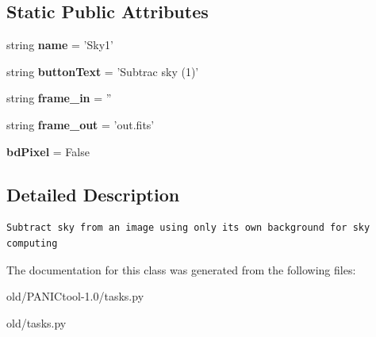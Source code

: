 \subsection*{Static Public Attributes}
\begin{CompactItemize}
\item 
string \textbf{name} = '{\bfsubtract\-Sky1}'\label{classtasks_1_1subtractSky1_3994cfc4830490764a84beb720623647}

\item 
string \textbf{button\-Text} = 'Subtrac sky (1)'\label{classtasks_1_1subtractSky1_cd000199d9177ded82d21fc70c32cebe}

\item 
string \textbf{frame\_\-in} = ''\label{classtasks_1_1subtractSky1_43e6a614bb07a54efc8e16bc1d178fb7}

\item 
string \textbf{frame\_\-out} = 'out.fits'\label{classtasks_1_1subtractSky1_ded60b278e39b21c9440dac5a8847287}

\item 
\textbf{bd\-Pixel} = False\label{classtasks_1_1subtractSky1_7099682b70e9d052e784c82b504a51a3}

\end{CompactItemize}


\subsection{Detailed Description}


\footnotesize\begin{verbatim}Subtract sky from an image using only its own background for sky computing
\end{verbatim}
\normalsize
 



The documentation for this class was generated from the following files:\begin{CompactItemize}
\item 
old/PANICtool-1.0/tasks.py\item 
old/tasks.py\end{CompactItemize}

